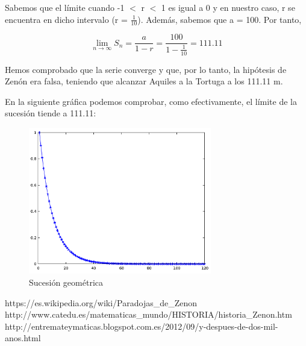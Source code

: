 \documentclass[a4paper,12pt]{article}
\begin{document}
   Sabemos que el límite cuando -1 $<$ r $<$ 1 es igual a 0 y en nuestro caso, r se encuentra en
   dicho intervalo (r = $\frac{1}{10}$). Además, sabemos que a = 100. Por tanto, 
   
   \begin{equation}
   \lim\limits_{n \rightarrow \infty} S_n = \frac{a}{1 - r} = \frac{100}{1 - \frac{1}{10}} = 111.11
   \end{equation}
   
   Hemos comprobado que la serie converge y que, por lo tanto, la hipótesis de Zenón era falsa,
   teniendo que alcanzar Aquiles a la Tortuga a los 111.11 m.
   
   En la siguiente gráfica podemos comprobar, como efectivamente, 
   el límite de la sucesión tiende a 111.11: \newline
   
   \begin{figure}[h]
   \begin{center}
   \includegraphics[width=8cm]{Octave/SucesionAquilesyTortuga.png}
   \end{center}
   \caption{Sucesión geométrica}
   \label{fig:aquiles2}
   \end{figure} 
      
   \newpage
   
   \begin{thebibliography}{99}
   
       https://es.wikipedia.org/wiki/Paradojas\_de\_Zenon
       http://www.catedu.es/matematicas\_mundo/HISTORIA/historia\_Zenon.htm
      http://entremateymaticas.blogspot.com.es/2012/09/y-despues-de-dos-mil-anos.html
      
   \end{thebibliography}
  
\end{document}

